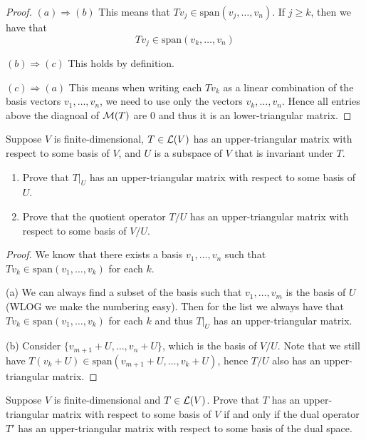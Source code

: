 \documentclass{extarticle}
\begin{document}
\begin{proof}
\((a) \Rightarrow (b)\) This means that \(Tv_j \in \text{span}(v_j, \ldots, v_n)\). If \(j \geq k\), then 
we have that 
\[T v_j \in \text{span}(v_k, \ldots, v_n)\]

\((b) \Rightarrow (c)\) This holds by definition. 

\((c) \Rightarrow (a)\) This means when writing each \(Tv_k\) as a linear combination of the basis vectors 
\(v_1, \ldots, v_n\), we need to use only the vectors \(v_k, \ldots, v_n\). Hence all entries above the 
diagnoal of \(\mathcal{M}(T)\) are 0 and thus it is an lower-triangular matrix.
\end{proof}


\begin{problem}{12}
    Suppose \(V\) is finite-dimensional, \(T \in \mathcal{L}(V)\) has an upper-triangular matrix with respect 
    to some basis of \(V\), and \(U\) is a subspace of \(V\) that is invariant under \(T\). 
    \begin{enumerate}[label=(\alph*)]
        \item Prove that \(T|_U\) has an upper-triangular matrix with respect to some basis of \(U\). 
        \item Prove that the quotient operator \(T/U\) has an upper-triangular matrix with respect 
        to some basis of \(V/U\).
    \end{enumerate}
\end{problem}

\begin{proof} We know that there exists a basis \(v_1, \ldots, v_n\) 
    such that \(T v_k \in \text{span}(v_1, \ldots, v_k)\) for each \(k\). 

(a) We can always find a subset of the basis such that \(v_1, \ldots, v_m\) is the basis of 
\(U\) (WLOG we make the numbering easy). Then for the list we always have that \(T v_k \in 
\text{span}(v_1, \ldots, v_k)\) for each \(k\) and thus \(T|_U\) has an upper-triangular matrix. 

(b) Consider \(\{v_{m+1} + U, \ldots, v_n + U\}\), which is the basis of \(V/U\). Note that 
we still have \(T(v_k + U) \in \text{span}(v_{m+1} + U, \ldots, v_{k} +U)\), hence \(T/U\) 
also has an upper-triangular matrix. 
\end{proof}


\begin{problem}{14}
    Suppose \(V\) is finite-dimensional and \(T \in \mathcal{L}(V)\). Prove that \(T\) has an upper-triangular 
    matrix with respect to some basis of \(V\) if and only if the dual operator \(T'\) has an upper-triangular 
    matrix with respect to some basis of the dual space. 
\end{problem}
\end{document}
